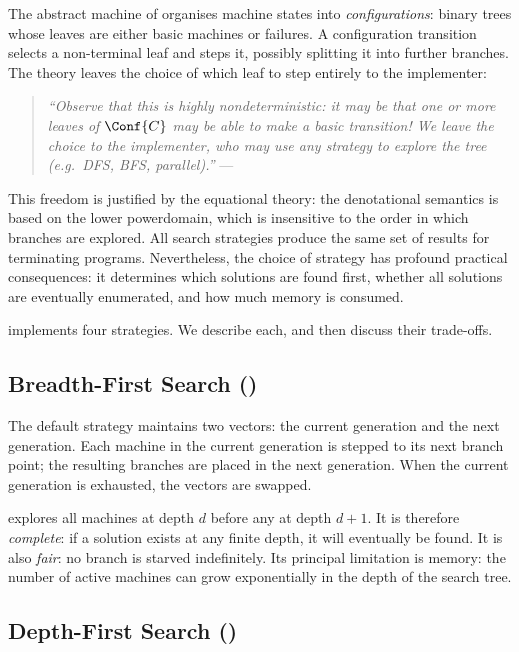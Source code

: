 The abstract machine of \parencite{jones_2026} organises machine states into
\emph{configurations}: binary trees whose leaves are either basic machines or
failures. A configuration transition selects a non-terminal leaf and steps it,
possibly splitting it into further branches. The theory leaves the choice of
which leaf to step entirely to the implementer:

\begin{quote}
  \emph{``Observe that this is highly nondeterministic: it may be that one or
  more leaves of $\Conf{C}$ may be able to make a basic transition! We leave
  the choice to the implementer, who may use any strategy to explore the tree
  (e.g.~DFS, BFS, parallel).''} \hfill---\parencite{jones_2026}
\end{quote}

\noindent This freedom is justified by the equational theory: the denotational
semantics is based on the lower powerdomain, which is insensitive to the order
in which branches are explored. All search strategies produce the same set of
results for terminating programs. Nevertheless, the choice of strategy has
profound practical consequences: it determines which solutions are found first,
whether all solutions are eventually enumerated, and how much memory is
consumed.

\Gweek{} implements four strategies. We describe each, and then discuss their
trade-offs.

\subsection{Breadth-First Search (\BFS{})}

The default strategy maintains two vectors: the current generation and the next
generation. Each machine in the current generation is stepped to its next branch
point; the resulting branches are placed in the next generation. When the
current generation is exhausted, the vectors are swapped.

\BFS{} explores all machines at depth $d$ before any at depth $d+1$. It is
therefore \emph{complete}: if a solution exists at any finite depth, it will
eventually be found. It is also \emph{fair}: no branch is starved indefinitely.
Its principal limitation is memory: the number of active machines can grow
exponentially in the depth of the search tree.

\subsection{Depth-First Search (\DFS{})}

